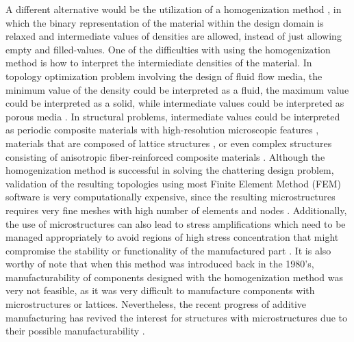 \documentclass[../main.tex]{subfiles}
\begin{document}
A different alternative would be the utilization of a homogenization method \cite{bendsoeOptimizationStructuralTopology1995}, \cite{allaireShapeOptimizationHomogenization2002} \cite{suzukiHomogenizationMethodShape1991} in which the binary representation of the material within the design domain is relaxed and intermediate values of densities are allowed, instead of just allowing empty and filled-values. One of the difficulties with using the homogenization method is how to interpret the intermiediate densities of the material. In topology optimization problem involving the design of fluid flow media, the minimum value of the density could be interpreted as a fluid, the maximum value could be interpreted as a solid, while intermediate values could be interpreted as porous media \cite{pietropaoliThreedimensionalFluidTopology2019}. In structural problems, intermediate values could be interpreted as periodic composite materials with high-resolution microscopic features \cite{groenHomogenizationbasedTopologyOptimization2018} \cite{alexandersenTopologyOptimisationManufacturable2015}, materials that are composed of lattice structures \cite{allaireTopologyOptimizationModulated2019}, or even complex structures consisting of anisotropic fiber-reinforced composite materials \cite{kimTopologyOptimizationFunctionally2020}. Although the homogenization method is successful in solving the chattering design problem, validation of the resulting topologies using most Finite Element Method (FEM) software is very computationally expensive, since the resulting microstructures requires very fine meshes with high number of elements and nodes \cite{kimComputationalHomogenizationAdditively2022}. Additionally, the use of microstructures can also lead to stress amplifications which need to be managed appropriately to avoid regions of high stress concentration that might compromise the stability or functionality of the manufactured part \cite{allaireTopologyOptimizationMinimum2004}. It is also worthy of note that when this method was introduced back in the 1980's, manufacturability of components designed with the homogenization method was very not feasible, as it was very difficult to manufacture components with microstructures or lattices. Nevertheless, the recent progress of additive manufacturing has revived the interest for structures with microstructures due to their possible manufacturability \cite{allaireHomogenizationMethodTopology2019}.
\end{document}
